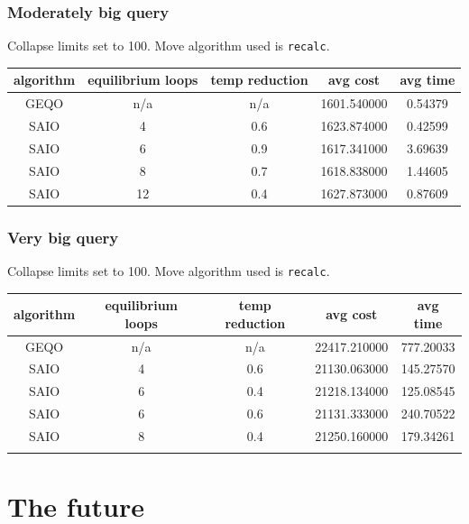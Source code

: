 \documentclass{beamer}
\begin{document}
\begin{frame}
  \frametitle{Moderately big query}

  Collapse limits set to 100. Move algorithm used is \texttt{recalc}.

  \begin{center}
    \begin{tabular}{ccccc}
      algorithm & equilibrium loops & temp reduction & avg cost & avg time
      \\ \hline \hline
      GEQO & n/a & n/a & 1601.540000 & 0.54379 \\ \hline
      SAIO & 4 & 0.6 & 1623.874000 & 0.42599 \\ \hline
      SAIO & 6 & 0.9 & 1617.341000 & 3.69639 \\ \hline
      SAIO & 8 & 0.7 & 1618.838000 & 1.44605 \\ \hline
      SAIO & 12 & 0.4 & 1627.873000 & 0.87609 \\ \hline
    \end{tabular}
  \end{center}

\end{frame}

\begin{frame}
  \frametitle{Very big query}

  Collapse limits set to 100. Move algorithm used is \texttt{recalc}.

  \begin{center}
    \begin{tabular}{ccccc}
      algorithm & equilibrium loops & temp reduction & avg cost & avg time
      \\ \hline \hline
      GEQO & n/a & n/a & 22417.210000 & 777.20033 \\ \hline
      SAIO & 4 & 0.6 & 21130.063000 & 145.27570 \\ \hline
      SAIO & 6 & 0.4 & 21218.134000 & 125.08545 \\ \hline
      SAIO & 6 & 0.6 & 21131.333000 & 240.70522 \\ \hline
      SAIO & 8 & 0.4 & 21250.160000 & 179.34261 \\ \hline
      \\ \hline \hline
    \end{tabular}
  \end{center}

\end{frame}

\section{The future}
\end{document}
